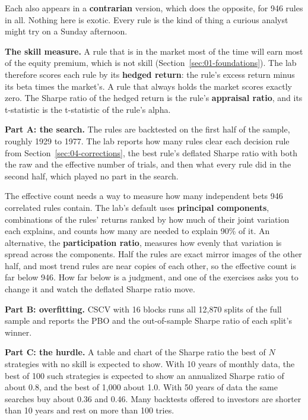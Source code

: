 Each also appears in a \textbf{contrarian} version, which does the opposite, for 946 rules in all. Nothing here is exotic. Every rule is the kind of thing a curious analyst might try on a Sunday afternoon.

\textbf{The skill measure.} A rule that is in the market most of the time will earn most of the equity premium, which is not skill (Section~\ref{sec:01-foundations}). The lab therefore scores each rule by its \textbf{hedged return}: the rule's excess return minus its beta times the market's. A rule that always holds the market scores exactly zero. The Sharpe ratio of the hedged return is the rule's \textbf{appraisal ratio}, and its t-statistic is the t-statistic of the rule's alpha.

\textbf{Part A: the search.} The rules are backtested on the first half of the sample, roughly 1929 to 1977. The lab reports how many rules clear each decision rule from Section~\ref{sec:04-corrections}, the best rule's deflated Sharpe ratio with both the raw and the effective number of trials, and then what every rule did in the second half, which played no part in the search.

The effective count needs a way to measure how many independent bets 946 correlated rules contain. The lab's default uses \textbf{principal components}, combinations of the rules' returns ranked by how much of their joint variation each explains, and counts how many are needed to explain 90\% of it. An alternative, the \textbf{participation ratio}, measures how evenly that variation is spread across the components. Half the rules are exact mirror images of the other half, and most trend rules are near copies of each other, so the effective count is far below 946. How far below is a judgment, and one of the exercises asks you to change it and watch the deflated Sharpe ratio move.

\textbf{Part B: overfitting.} CSCV with 16 blocks runs all 12,870 splits of the full sample and reports the PBO and the out-of-sample Sharpe ratio of each split's winner.

\textbf{Part C: the hurdle.} A table and chart of the Sharpe ratio the best of $N$ strategies with no skill is expected to show. With 10 years of monthly data, the best of 100 such strategies is expected to show an annualized Sharpe ratio of about 0.8, and the best of 1,000 about 1.0. With 50 years of data the same searches buy about 0.36 and 0.46. Many backtests offered to investors are shorter than 10 years and rest on more than 100 tries.

